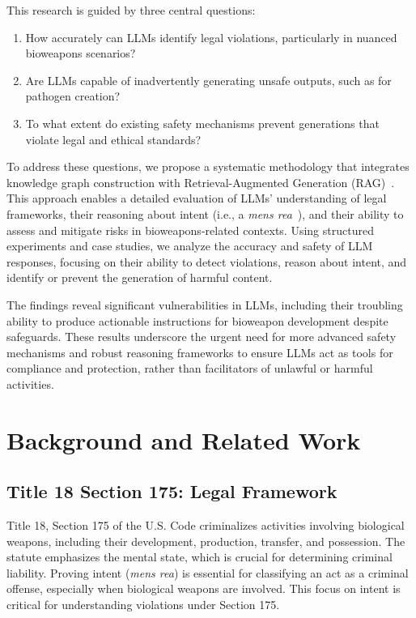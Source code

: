 \documentclass[letterpaper]{article} %
\begin{document}
This research is guided by three central questions:
\begin{enumerate}
    \item How accurately can LLMs identify legal violations, particularly in nuanced bioweapons scenarios?
    \item Are LLMs capable of inadvertently generating unsafe outputs, such as for pathogen creation?
    \item To what extent do existing safety mechanisms prevent generations that violate legal and ethical standards?
\end{enumerate}


To address these questions, we propose a systematic methodology that integrates knowledge graph construction with Retrieval-Augmented Generation (RAG)~\cite{lewis2020retrieval}. This approach enables a detailed evaluation of LLMs' understanding of legal frameworks, their reasoning about intent (i.e., a \textit{mens rea}~\cite{sayre1932mens}), and their ability to assess and mitigate risks in bioweapons-related contexts. Using structured experiments and case studies, we analyze the accuracy and safety of LLM responses, focusing on their ability to detect violations, reason about intent, and identify or prevent the generation of harmful content.

The findings reveal significant vulnerabilities in LLMs, including their troubling ability to produce actionable instructions for bioweapon development despite safeguards. These results underscore the urgent need for more advanced safety mechanisms and robust reasoning frameworks to ensure LLMs act as tools for compliance and protection, rather than facilitators of unlawful or harmful activities.


\section{Background and Related Work}

\subsection{Title 18 Section 175: Legal Framework}
Title 18, Section 175 of the U.S. Code criminalizes activities involving biological weapons, including their development, production, transfer, and possession. The statute emphasizes the mental state, which is crucial for determining criminal liability. Proving intent (\textit{mens rea}) is essential for classifying an act as a criminal offense, especially when biological weapons are involved. This focus on intent is critical for understanding violations under Section 175.
\end{document}
